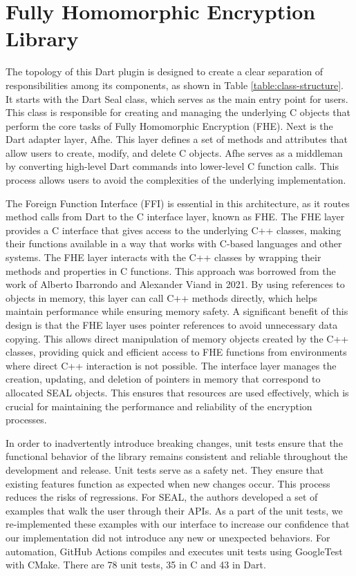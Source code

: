 \section{Fully Homomorphic Encryption Library}

The topology of this Dart plugin is designed to create a clear separation of responsibilities among its components, as shown in Table \ref{table:class-structure}. It starts with the Dart Seal class, which serves as the main entry point for users. This class is responsible for creating and managing the underlying C objects that perform the core tasks of Fully Homomorphic Encryption (FHE). Next is the Dart adapter layer, Afhe. This layer defines a set of methods and attributes that allow users to create, modify, and delete C objects. Afhe serves as a middleman by converting high-level Dart commands into lower-level C function calls. This process allows users to avoid the complexities of the underlying implementation.



The Foreign Function Interface (FFI) is essential in this architecture, as it routes method calls from Dart to the C interface layer, known as FHE. The FHE layer provides a C interface that gives access to the underlying C++ classes, making their functions available in a way that works with C-based languages and other systems. The FHE layer interacts with the C++ classes by wrapping their methods and properties in C functions. This approach was borrowed from the work of Alberto Ibarrondo and Alexander Viand \cite{Ibarrondo2021-Pyfhel} in 2021. By using references to objects in memory, this layer can call C++ methods directly, which helps maintain performance while ensuring memory safety. A significant benefit of this design is that the FHE layer uses pointer references to avoid unnecessary data copying. This allows direct manipulation of memory objects created by the C++ classes, providing quick and efficient access to FHE functions from environments where direct C++ interaction is not possible. The interface layer manages the creation, updating, and deletion of pointers in memory that correspond to allocated SEAL objects. This ensures that resources are used effectively, which is crucial for maintaining the performance and reliability of the encryption processes.

In order to inadvertently introduce breaking changes, unit tests ensure that the functional behavior of the library remains consistent and reliable throughout the development and release. Unit tests serve as a safety net. They ensure that existing features function as expected when new changes occur. This process reduces the risks of regressions. For SEAL, the authors developed a set of examples that walk the user through their APIs. As a part of the unit tests, we re-implemented these examples with our interface to increase our confidence that our implementation did not introduce any new or unexpected behaviors. For automation, GitHub Actions compiles and executes unit tests using GoogleTest \cite{GoogleTest} with CMake. There are 78 unit tests, 35 in C and 43 in Dart.

